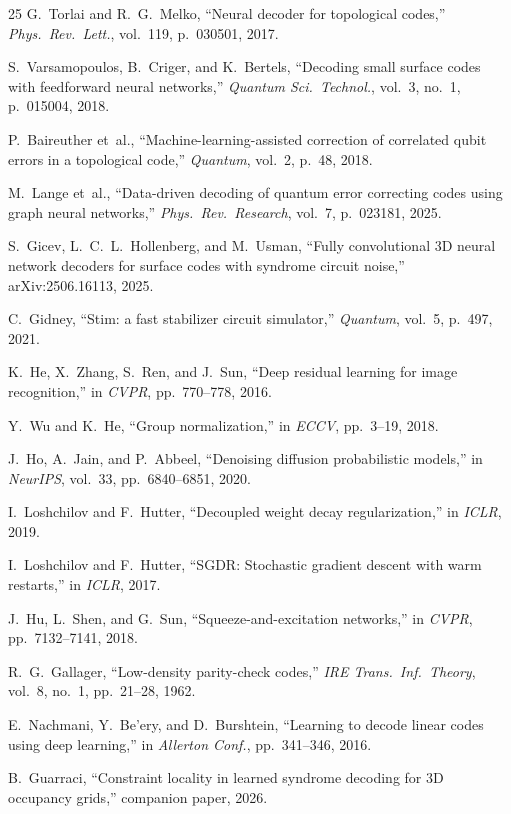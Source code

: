 \documentclass[11pt,a4paper]{article}
\begin{document}
\begin{thebibliography}{25}
G.~Torlai and R.~G.~Melko, ``Neural decoder for topological codes,''
\emph{Phys.\ Rev.\ Lett.}, vol.~119, p.~030501, 2017.

S.~Varsamopoulos, B.~Criger, and K.~Bertels, ``Decoding small surface
codes with feedforward neural networks,'' \emph{Quantum Sci.\ Technol.},
vol.~3, no.~1, p.~015004, 2018.

P.~Baireuther et~al., ``Machine-learning-assisted correction of
correlated qubit errors in a topological code,'' \emph{Quantum}, vol.~2,
p.~48, 2018.

M.~Lange et~al., ``Data-driven decoding of quantum error correcting
codes using graph neural networks,'' \emph{Phys.\ Rev.\ Research},
vol.~7, p.~023181, 2025.

S.~Gicev, L.~C.~L.~Hollenberg, and M.~Usman, ``Fully convolutional 3D
neural network decoders for surface codes with syndrome circuit noise,''
arXiv:2506.16113, 2025.

C.~Gidney, ``Stim: a fast stabilizer circuit simulator,''
\emph{Quantum}, vol.~5, p.~497, 2021.

K.~He, X.~Zhang, S.~Ren, and J.~Sun, ``Deep residual learning for
image recognition,'' in \emph{CVPR}, pp.~770--778, 2016.

Y.~Wu and K.~He, ``Group normalization,'' in \emph{ECCV}, pp.~3--19,
2018.

J.~Ho, A.~Jain, and P.~Abbeel, ``Denoising diffusion probabilistic
models,'' in \emph{NeurIPS}, vol.~33, pp.~6840--6851, 2020.

I.~Loshchilov and F.~Hutter, ``Decoupled weight decay regularization,''
in \emph{ICLR}, 2019.

I.~Loshchilov and F.~Hutter, ``SGDR: Stochastic gradient descent with
warm restarts,'' in \emph{ICLR}, 2017.

J.~Hu, L.~Shen, and G.~Sun, ``Squeeze-and-excitation networks,'' in
\emph{CVPR}, pp.~7132--7141, 2018.

R.~G.~Gallager, ``Low-density parity-check codes,'' \emph{IRE Trans.\
Inf.\ Theory}, vol.~8, no.~1, pp.~21--28, 1962.

E.~Nachmani, Y.~Be'ery, and D.~Burshtein, ``Learning to decode linear
codes using deep learning,'' in \emph{Allerton Conf.}, pp.~341--346,
2016.

B.~Guarraci, ``Constraint locality in learned syndrome decoding for 3D
occupancy grids,''
companion paper, 2026.

\end{thebibliography}
\end{document}
